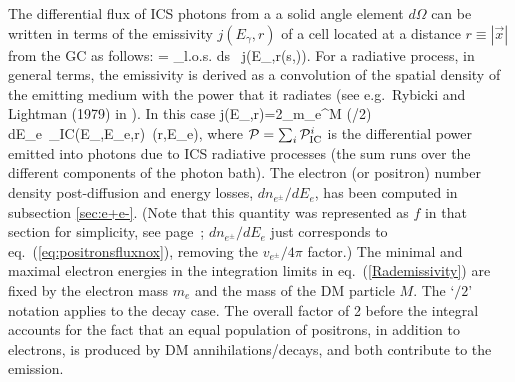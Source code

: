 \medskip

The differential flux of ICS photons from a
a solid angle element $d \Omega$ can be written in terms of the emissivity $j(E_\gamma,r)$ of a cell located at a distance $r\equiv|\vec x|$ from the GC as follows:
\beq
\label{eq:ICSbasic}
 =   \int_{\rm l.o.s.} ds \, j(E_\gamma,r(s,\theta)).
\eeq
For a radiative process, in general terms, the emissivity is derived as a convolution of the spatial density of the emitting medium with the power that it radiates (see e.g.~Rybicki and Lightman (1979) in \cite{CRtransport}). In this case 
\beq
\label{Rademissivity}
j(E_\gamma,r)=2\int_{m_e}^{M (/2)} \hspace{-0.45cm} dE_e\ _{\rm IC}(E_\gamma,E_e,r)\ (r,E_e),
\eeq
where $\mathcal P=\sum_i \mathcal P_{\rm IC}^i$ is the differential power emitted into photons due to ICS radiative processes (the sum runs over the different components of the photon bath).
 The electron (or positron) number density post-diffusion and energy losses, $dn_{e^\pm}/dE_e$, has been computed in subsection \ref{sec:e+e-}. 
 (Note that this quantity was represented as $f$ in that section for simplicity, see page~\pageref{eq:diffeq}; $dn_{e^\pm}/dE_e$ 
 just corresponds to eq.~(\ref{eq:positronsfluxnox}), 
 removing the $v_{e^\pm}/4\pi$ factor.) 
The minimal and maximal electron energies in the integration limits in eq.~(\ref{Rademissivity}) are fixed by the electron mass $m_e$ and the mass of the DM particle $M$. The `$/2$' notation applies to the decay case. The overall factor of 2 before the integral 
 accounts for the fact that an equal population of positrons, in addition to electrons, is produced by DM annihilations/decays, and both contribute to the emission.


\medskip


